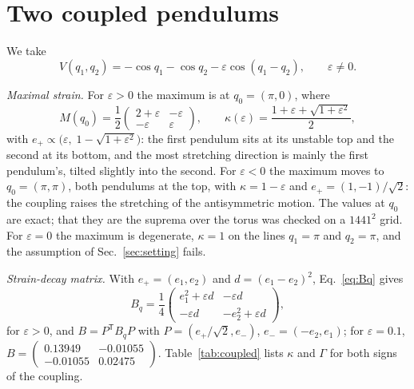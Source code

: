 \section{Two coupled pendulums}
\label{sec:coupled}

We take
\begin{equation}
V(q_1,q_2) = -\cos q_1 - \cos q_2 - \varepsilon\cos(q_1 - q_2), \qquad \varepsilon \neq 0 .
\label{eq:coupledV}
\end{equation}

\emph{Maximal strain.} For $\varepsilon > 0$ the maximum is at $q_0 = (\pi, 0)$, where
\begin{equation}
M(q_0) = \frac12\begin{pmatrix} 2+\varepsilon & -\varepsilon \\ -\varepsilon & \varepsilon \end{pmatrix},
\qquad
\kappa(\varepsilon) = \frac{1 + \varepsilon + \sqrt{1+\varepsilon^2}}{2},
\label{eq:coupledkappa}
\end{equation}
with $e_+ \propto \big(\varepsilon,\; 1 - \sqrt{1+\varepsilon^2}\big)$: the first pendulum sits at its unstable top and the second at its bottom, and the most stretching direction is mainly the first pendulum's, tilted slightly into the second. For $\varepsilon < 0$ the maximum moves to $q_0 = (\pi,\pi)$, both pendulums at the top, with $\kappa = 1 - \varepsilon$ and $e_+ = (1,-1)/\sqrt2$: the coupling raises the stretching of the antisymmetric motion. The values at $q_0$ are exact; that they are the suprema over the torus was checked on a $1441^2$ grid. For $\varepsilon = 0$ the maximum is degenerate, $\kappa = 1$ on the lines $q_1 = \pi$ and $q_2 = \pi$, and the assumption of Sec.~\ref{sec:setting} fails.

\emph{Strain-decay matrix.} With $e_+ = (e_1, e_2)$ and $d = (e_1 - e_2)^2$, Eq.~\eqref{eq:Bq} gives
\begin{equation}
B_q = \frac14\begin{pmatrix} e_1^2 + \varepsilon d & -\varepsilon d \\ -\varepsilon d & -e_2^2 + \varepsilon d\end{pmatrix},
\label{eq:coupledBq}
\end{equation}
for $\varepsilon > 0$, and $B = P^{\mathsf T}B_qP$ with $P = (e_+/\sqrt2, e_-)$, $e_- = (-e_2, e_1)$; for $\varepsilon = 0.1$, $B = \begin{pmatrix}0.13949 & -0.01055\\ -0.01055 & 0.02475\end{pmatrix}$. Table~\ref{tab:coupled} lists $\kappa$ and $\Gamma$ for both signs of the coupling.


